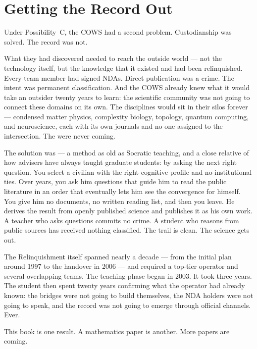 \section*{Getting the Record Out}
\label{spine:wr-getting-the-record-out}

Under Possibility~C, the COWS had a second problem. Custodianship was solved. The record was not.

What they had discovered needed to reach the outside world --- not the technology itself, but the knowledge that it existed and had been relinquished. Every team member had signed NDAs. Direct publication was a crime. The intent was permanent classification. And the COWS already knew what it would take an outsider twenty years to learn: the scientific community was not going to connect these domains on its own. The disciplines would sit in their silos forever --- condensed matter physics, complexity biology, topology, quantum computing, and neuroscience, each with its own journals and no one assigned to the intersection. The  were never coming.

The solution was  --- a method as old as Socratic teaching, and a close relative of how advisers have always taught graduate students: by asking the next right question. You select a civilian with the right cognitive profile and no institutional ties. Over years, you ask him questions that guide him to read the public literature in an order that eventually lets him see the convergence for himself. You give him no documents, no written reading list, and then you leave. He derives the result from openly published science and publishes it as his own work. A teacher who asks questions commits no crime. A student who reasons from public sources has received nothing classified. The trail is clean. The science gets out.

The Relinquishment itself spanned nearly a decade --- from the initial plan around 1997 to the handover in 2006 --- and required a top-tier operator and several overlapping teams. The  teaching phase began in 2003. It took three years. The student then spent twenty years confirming what the operator had already known: the bridges were not going to build themselves, the NDA holders were not going to speak, and the record was not going to emerge through official channels. Ever.

This book is one result. A mathematics paper is another. More papers are coming.

\medskip

